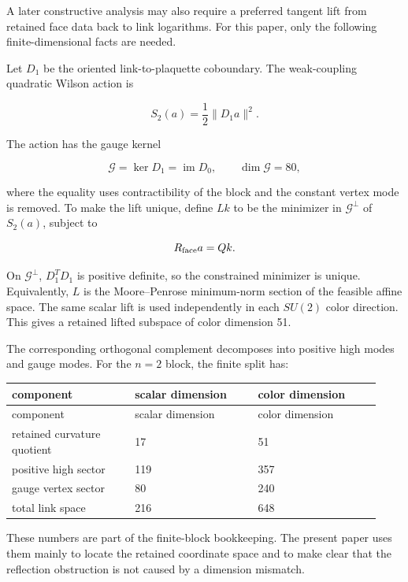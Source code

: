 \documentclass[10pt]{article}
\begin{document}
A later constructive analysis may also require a preferred tangent lift from retained face data back to link logarithms.  For this paper, only the following finite-dimensional facts are needed.

Let \(D_1\) be the oriented link-to-plaquette coboundary.  The weak-coupling quadratic Wilson action is

\[
S_2(a)=\frac12\|D_1a\|^2.
\]

The action has the gauge kernel

\[
\mathcal G=\ker D_1=\operatorname{im}D_0,
\qquad \dim\mathcal G=80,
\]

where the equality uses contractibility of the block and the constant vertex mode is removed.  To make the lift unique, define \(Lk\) to be the minimizer in \(\mathcal G^\perp\) of \(S_2(a)\), subject to

\[
R_{\rm face}a=Qk.
\]

On \(\mathcal G^\perp\), \(D_1^TD_1\) is positive definite, so the constrained minimizer is unique.  Equivalently, \(L\) is the Moore--Penrose minimum-norm section of the feasible affine space.  The same scalar lift is used independently in each \(SU(2)\) color direction.  This gives a retained lifted subspace of color dimension 51.

The corresponding orthogonal complement decomposes into positive high modes and gauge modes.  For the \(n=2\) block, the finite split has:

\begin{center}
\small
\begin{longtable}{|p{0.31\linewidth}|p{0.31\linewidth}|p{0.31\linewidth}|}
\hline
component & scalar dimension & color dimension \\
\hline
\endfirsthead
\hline
component & scalar dimension & color dimension \\
\hline
\endhead
retained curvature quotient & 17 & 51 \\
\hline
positive high sector & 119 & 357 \\
\hline
gauge vertex sector & 80 & 240 \\
\hline
total link space & 216 & 648 \\
\hline
\end{longtable}
\end{center}

These numbers are part of the finite-block bookkeeping.  The present paper uses them mainly to locate the retained coordinate space and to make clear that the reflection obstruction is not caused by a dimension mismatch.
\end{document}
